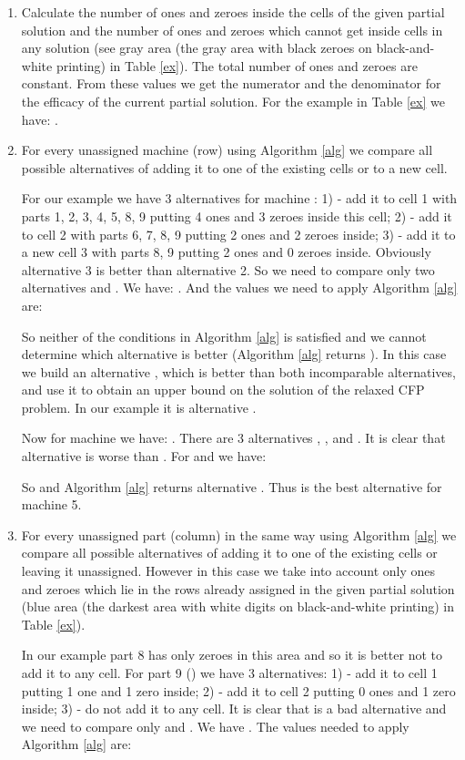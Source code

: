 \documentclass[citeauthoryear]{llncs}
\begin{document}
\begin{enumerate}
\item
Calculate the number of ones  and zeroes  inside the cells of the given partial solution and the number of ones  and zeroes  which cannot get inside cells in any solution (see gray area (the gray area with black zeroes on black-and-white printing) in Table \ref{ex}).
The total number of ones  and zeroes  are constant.
From these values we get the numerator  and the denominator  for the efficacy  of the current partial solution.
For the example in Table \ref{ex} we have: .

\item
For every unassigned machine (row) using Algorithm \ref{alg} we compare all possible alternatives of adding it to one of the existing cells or to a new cell.

For our example we have 3 alternatives for machine : 1)  - add it to cell 1 with parts 1, 2, 3, 4, 5, 8, 9 putting 4 ones and 3 zeroes inside this cell; 2)  - add it to cell 2 with parts 6, 7, 8, 9 putting 2 ones and 2 zeroes inside; 3)  - add it to a new cell 3 with parts 8, 9 putting 2 ones and 0 zeroes inside.
Obviously alternative 3 is better than alternative 2.
So we need to compare only two alternatives  and .
We have: .
And the values we need to apply Algorithm \ref{alg} are:

So neither of the conditions in Algorithm \ref{alg} is satisfied and we cannot determine which alternative is better (Algorithm \ref{alg} returns ).
In this case we build an alternative , which is better than both incomparable alternatives, and use it to obtain an upper bound on the solution of the relaxed CFP problem.
In our example it is alternative .

Now for machine  we have: .
There are 3 alternatives , , and .
It is clear that alternative  is worse than .
For  and  we have:

So  and Algorithm \ref{alg} returns alternative .
Thus  is the best alternative for machine 5.

\item
For every unassigned part (column) in the same way using Algorithm \ref{alg} we compare all possible alternatives of adding it to one of the existing cells or leaving it unassigned.
However in this case we take into account only ones and zeroes which lie in the rows already assigned in the given partial solution (blue area (the darkest area with white digits on black-and-white printing) in Table \ref{ex}).

In our example part 8 has only zeroes in this area and so it is better not to add it to any cell.
For part 9 () we have 3 alternatives: 1)  - add it to cell 1 putting 1 one and 1 zero inside; 2)  - add it to cell 2 putting 0 ones and 1 zero inside; 3)  - do not add it to any cell.
It is clear that  is a bad alternative and we need to compare only  and .
We have .
The values needed to apply Algorithm \ref{alg} are:


\end{enumerate}
\end{document}
